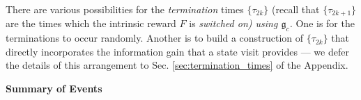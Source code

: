 \documentclass{article}
\begin{document}
    
% 
% 
% 
% 
There are various possibilities for the \textit{termination} times $\{\tau_{2k}\}$ (recall that $\{\tau_{2k+1}\}$ are the times
which the intrinsic reward $F$ is \textit{switched on) using $\mathfrak{g}_c$.} One is for the terminations to occur randomly. Another is to build a construction of $\{\tau_{2k}\}$ that directly incorporates the information gain that a state visit provides --- we defer the details of this arrangement to Sec. \ref{sec:termination_times} of the Appendix.

\noindent\textbf{{Summary of Events}}
\end{document}
